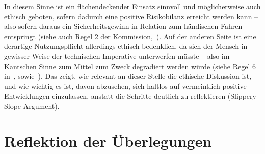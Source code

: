 \documentclass[twocolumn, german]{tum-article}
\begin{document}
In diesem Sinne ist ein flächendeckender Einsatz sinnvoll und möglicherweise auch ethisch geboten, sofern dadurch eine positive Risikobilanz erreicht werden kann -- also sofern daraus ein Sicherheitsgewinn in Relation zum händischen Fahren entspringt (siehe auch Regel 2 der Kommission,~\cite[S. 10]{ethik-komission}).
Auf der anderen Seite ist eine derartige Nutzungspflicht allerdings ethisch bedenklich, da sich der Mensch in gewisser Weise der technischen Imperative unterwerfen müsste -- also im Kantschen Sinne zum Mittel zum Zweck degradiert werden würde (siehe Regel 6 in~\cite[S. 11]{ethik-komission}, sowie~\cite[S. 551]{ethics-code}).
Das zeigt, wie relevant an dieser Stelle die ethische Diskussion ist, und wie wichtig es ist, davon abzusehen, sich haltlos auf vermeintlich positive Entwicklungen einzulassen, anstatt die Schritte deutlich zu reflektieren (Slippery-Slope-Argument).




\section{Reflektion der Überlegungen}
\label{sec:reflect}

\printbibliography
\end{document}
